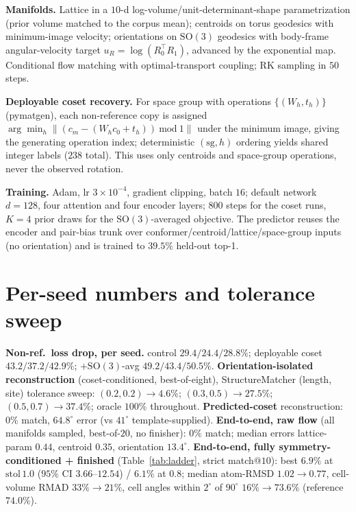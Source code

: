 \documentclass{article}
\begin{document}
\textbf{Manifolds.} Lattice in a $10$-d log-volume/unit-determinant-shape
parametrization (prior volume matched to the corpus mean); centroids on torus
geodesics with minimum-image velocity; orientations on $\mathrm{SO}(3)$ geodesics
with body-frame angular-velocity target $u_R=\log(R_0^\top R_1)$, advanced by the
exponential map. Conditional flow matching\cite{lipman2023flowmatching} with
optimal-transport coupling\cite{pooladian2023multisample}; RK sampling in $50$
steps.

\textbf{Deployable coset recovery.} For space group with operations
$\{(W_h,t_h)\}$ (pymatgen), each non-reference copy is assigned
$\arg\min_h \lVert (c_m-(W_h c_0+t_h))\ \mathrm{mod}\ 1\rVert$ under the minimum
image, giving the generating operation index; deterministic $(\text{sg},h)$
ordering yields shared integer labels ($238$ total). This uses only centroids and
space-group operations, never the observed rotation.

\textbf{Training.} Adam, lr $3\times10^{-4}$, gradient clipping, batch $16$;
default network $d{=}128$, four attention and four encoder layers; $800$ steps for
the coset runs, $K{=}4$ prior draws for the $\mathrm{SO}(3)$-averaged objective.
The predictor reuses the encoder and pair-bias trunk over
conformer/centroid/lattice/space-group inputs (no orientation) and is trained to
$39.5\%$ held-out top-1.

\section{Per-seed numbers and tolerance sweep}
\label{app:numbers}
\textbf{Non-ref.\ loss drop, per seed.} control $29.4/24.4/28.8\%$; deployable
coset $43.2/37.2/42.9\%$; $+\mathrm{SO}(3)$-avg $49.2/43.4/50.5\%$.
\textbf{Orientation-isolated reconstruction} (coset-conditioned, best-of-eight),
StructureMatcher (length, site) tolerance sweep: $(0.2,0.2)\!\to\!4.6\%$;
$(0.3,0.5)\!\to\!27.5\%$; $(0.5,0.7)\!\to\!37.4\%$; oracle $100\%$ throughout.
\textbf{Predicted-coset} reconstruction: $0\%$ match, $64.8^\circ$ error (vs
$41^\circ$ template-supplied). \textbf{End-to-end, raw flow} (all manifolds sampled,
best-of-$20$, no finisher): $0\%$ match; median errors lattice-param $0.44$,
centroid $0.35$, orientation $13.4^\circ$. \textbf{End-to-end, fully
symmetry-conditioned + finished} (Table~\ref{tab:ladder}, strict match@$10$): best
$6.9\%$ at $\text{stol}\,1.0$ ($95\%$ CI $3.66$--$12.54$) / $6.1\%$ at $0.8$;
median atom-RMSD $1.02\!\to\!0.77$, cell-volume RMAD $33\%\!\to\!21\%$, cell angles
within $2^\circ$ of $90^\circ$ $16\%\!\to\!73.6\%$ (reference $74.0\%$).
\end{document}
